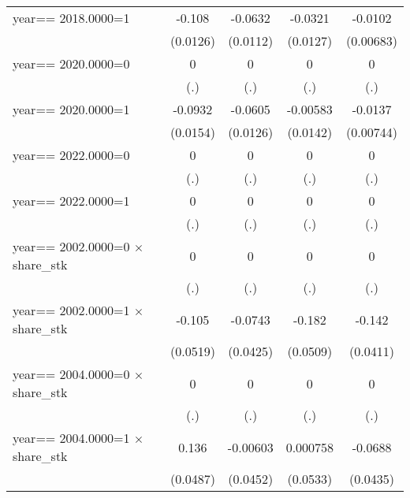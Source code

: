 \begin{table}[htbp]
\begin{tabular}{l*{4}{c}}
\addlinespace
year==  2018.0000=1&   -0.108\sym{***}&  -0.0632\sym{***}&  -0.0321\sym{**} &  -0.0102         \\
                & (0.0126)         & (0.0112)         & (0.0127)         &(0.00683)         \\
\addlinespace
year==  2020.0000=0&        0         &        0         &        0         &        0         \\
                &      (.)         &      (.)         &      (.)         &      (.)         \\
\addlinespace
year==  2020.0000=1&  -0.0932\sym{***}&  -0.0605\sym{***}& -0.00583         &  -0.0137\sym{*}  \\
                & (0.0154)         & (0.0126)         & (0.0142)         &(0.00744)         \\
\addlinespace
year==  2022.0000=0&        0         &        0         &        0         &        0         \\
                &      (.)         &      (.)         &      (.)         &      (.)         \\
\addlinespace
year==  2022.0000=1&        0         &        0         &        0         &        0         \\
                &      (.)         &      (.)         &      (.)         &      (.)         \\
\addlinespace
year==  2002.0000=0 $\times$ share\_stk&        0         &        0         &        0         &        0         \\
                &      (.)         &      (.)         &      (.)         &      (.)         \\
\addlinespace
year==  2002.0000=1 $\times$ share\_stk&   -0.105\sym{**} &  -0.0743\sym{*}  &   -0.182\sym{***}&   -0.142\sym{***}\\
                & (0.0519)         & (0.0425)         & (0.0509)         & (0.0411)         \\
\addlinespace
year==  2004.0000=0 $\times$ share\_stk&        0         &        0         &        0         &        0         \\
                &      (.)         &      (.)         &      (.)         &      (.)         \\
\addlinespace
year==  2004.0000=1 $\times$ share\_stk&    0.136\sym{***}& -0.00603         & 0.000758         &  -0.0688         \\
                & (0.0487)         & (0.0452)         & (0.0533)         & (0.0435)         \\

\end{tabular}
\end{table}
